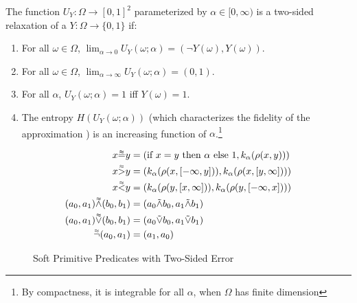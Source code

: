 \begin{definition}
The function $U_Y : \Omega \to [0, 1]^2$ parameterized by $\alpha \in [0, \infty)$ is a two-sided relaxation of a $Y: \Omega \to \{0, 1\}$ if:
\begin{enumerate}[label=(\roman*)]
	\label{def:temp}
	\item For all $\omega \in \Omega$, $\lim_{\alpha \to 0}U_Y(\omega; \alpha) = (\neg Y(\omega), Y(\omega))$.
	\item For all $\omega \in \Omega$, $\lim_{\alpha \to \infty}U_Y(\omega; \alpha) = (0, 1)$.

    \item For all $\alpha$, $U_Y(\omega; \alpha) = 1$ iff $Y(\omega) = 1$.
    \item The entropy $H(U_Y(\omega; \alpha))$ (which characterizes the fidelity of the approximation ) is an increasing function of $\alpha$.\footnote
    {By compactness, it is integrable for all $\alpha$, when $\Omega$ has finite dimension}
\end{enumerate}
\end{definition}


\begin{figure}\label{softw}
\begin{align*}
x \accentset{\approx}{=} y &= (\text{if } x = y  \text{ then } \alpha \text{ else } 1, k_\alpha(\rho(x, y)))\\
x \accentset{\approx}{>} y &= (k_\alpha(\rho(x, [-\infty, y])), k_\alpha(\rho(x, [y, \infty])))\\
x \accentset{\approx}{<} y &= (k_\alpha(\rho(y, [x, \infty])), k_\alpha(\rho(y, [-\infty, x])))\\
(a_0, a_1) \accentset{\approx}{\land} (b_0, b_1) &= (a_0 \tilde{\land} b_0, a_1 \tilde{\land} b_1)\\
(a_0, a_1) \accentset{\approx}{\lor} (b_0, b_1) &= (a_0 \tilde{\lor} b_0, a_1 \tilde{\lor} b_1)\\
\accentset{\approx}{\neg}(a_0, a_1) &= (a_1, a_0)
\end{align*}
\caption{Soft Primitive Predicates with Two-Sided Error}
\end{figure}




